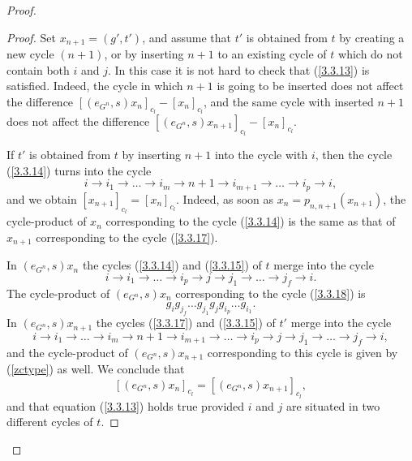 \documentclass[12pt]{amsart}
\theoremstyle{definition}
\numberwithin{equation}{section}
\begin{document}
\begin{proof}
\begin{proof}
Set $x_{n+1}=\left(g',t'\right)$, and assume that $t'$ is obtained from $t$ by creating a new cycle $(n+1)$, or by inserting $n+1$ to an existing cycle of $t$ which do not contain both $i$ and $j$. In this case it is not hard to check that (\ref{3.3.13}) is satisfied.
Indeed, the cycle in which $n+1$ is going to be inserted does not affect the difference
$\left[\left(e_{G^n},s\right)x_n\right]_{c_l}-\left[x_n\right]_{c_l}$, and the same cycle with inserted $n+1$ does not affect the difference
$\left[\left(e_{G^n},s\right)x_{n+1}\right]_{c_l}-\left[x_n\right]_{c_l}$.

If $t'$ is obtained from $t$ by inserting $n+1$ into the cycle with $i$, then  the cycle (\ref{3.3.14})
turns into the cycle
\begin{equation}\label{3.3.17}
i\rightarrow i_1\rightarrow\ldots\rightarrow i_m\rightarrow n+1\rightarrow i_{m+1}\rightarrow
\ldots\rightarrow i_p\rightarrow i,
\end{equation}
and we obtain $\left[x_{n+1}\right]_{c_l}=\left[x_n\right]_{c_l}$.  Indeed,
as soon as $x_n=p_{n,n+1}\left(x_{n+1}\right)$,
the cycle-product of $x_n$ corresponding to the cycle (\ref{3.3.14}) is the same as that of $x_{n+1}$ corresponding to the cycle
 (\ref{3.3.17}).

In $\left(e_{G^n},s\right)x_n$ the cycles (\ref{3.3.14}) and (\ref{3.3.15}) of $t$ merge into the cycle
\begin{equation}\label{3.3.18}
i\rightarrow i_1\rightarrow\ldots\rightarrow i_p\rightarrow j\rightarrow j_{1}\rightarrow
\ldots\rightarrow j_f\rightarrow i.
\end{equation}
The cycle-product of $\left(e_{G^n},s\right)x_n$ corresponding to the cycle (\ref{3.3.18})
is
\begin{equation}\label{zctype}
g_ig_{j_f}\ldots g_{j_1}g_{j}g_{i_p}\ldots g_{i_1}.
\end{equation}
In $\left(e_{G^n},s\right)x_{n+1}$ the cycles (\ref{3.3.17}) and (\ref{3.3.15}) of $t'$ merge into the cycle
\begin{equation}\label{3.3.19}
i\rightarrow i_1\rightarrow\ldots\rightarrow i_m\rightarrow n+1\rightarrow i_{m+1}\rightarrow
\ldots\rightarrow i_p\rightarrow j\rightarrow j_1\rightarrow \ldots\rightarrow j_f\rightarrow i,
\end{equation}
and the cycle-product of $\left(e_{G^n},s\right)x_{n+1}$ corresponding to this cycle is given by
(\ref{zctype}) as well. We conclude that
\begin{equation}\label{Zvzbv}
\left[\left(e_{G^n},s\right)x_{n}\right]_{c_l}=\left[\left(e_{G^n},s\right)x_{n+1}\right]_{c_l},
\end{equation}
and that equation (\ref{3.3.13}) holds true provided $i$ and $j$ are situated in two different cycles of $t$.


\end{proof}
\end{proof}
\end{document}
